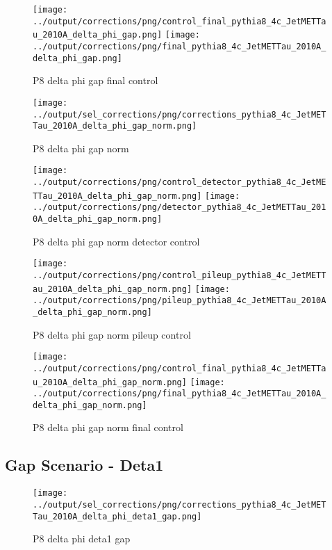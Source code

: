 \documentclass[11pt]{book}
\begin{document}
\begin{figure}[ht]
\centering
\texttt{[image: ../output/corrections/png/control\_final\_pythia8\_4c\_JetMETTau\_2010A\_delta\_phi\_gap.png]}
\texttt{[image: ../output/corrections/png/final\_pythia8\_4c\_JetMETTau\_2010A\_delta\_phi\_gap.png]}
\caption{P8 delta phi gap final control}
\label{fig:p8_JetMETTau_2010A_delta_phi_gap_final_control}
\end{figure}


\begin{figure}[ht]
\centering
\texttt{[image: ../output/sel\_corrections/png/corrections\_pythia8\_4c\_JetMETTau\_2010A\_delta\_phi\_gap\_norm.png]}
\caption{P8 delta phi gap norm}
\label{fig:p8_JetMETTau_2010A_delta_phi_gap_norm}
\end{figure}

\begin{figure}[ht]
\centering
\texttt{[image: ../output/corrections/png/control\_detector\_pythia8\_4c\_JetMETTau\_2010A\_delta\_phi\_gap\_norm.png]}
\texttt{[image: ../output/corrections/png/detector\_pythia8\_4c\_JetMETTau\_2010A\_delta\_phi\_gap\_norm.png]}
\caption{P8 delta phi gap norm detector control}
\label{fig:p8_JetMETTau_2010A_delta_phi_gap_norm_detector_control}
\end{figure}

\begin{figure}[ht]
\centering
\texttt{[image: ../output/corrections/png/control\_pileup\_pythia8\_4c\_JetMETTau\_2010A\_delta\_phi\_gap\_norm.png]}
\texttt{[image: ../output/corrections/png/pileup\_pythia8\_4c\_JetMETTau\_2010A\_delta\_phi\_gap\_norm.png]}
\caption{P8 delta phi gap norm pileup control}
\label{fig:p8_JetMETTau_2010A_delta_phi_gap_norm_pileup_control}
\end{figure}


\begin{figure}[ht]
\centering
\texttt{[image: ../output/corrections/png/control\_final\_pythia8\_4c\_JetMETTau\_2010A\_delta\_phi\_gap\_norm.png]}
\texttt{[image: ../output/corrections/png/final\_pythia8\_4c\_JetMETTau\_2010A\_delta\_phi\_gap\_norm.png]}
\caption{P8 delta phi gap norm final control}
\label{fig:p8_JetMETTau_2010A_delta_phi_gap_norm_final_control}
\end{figure}



\clearpage
\subsection{Gap Scenario - Deta1}
\begin{figure}[ht]
\centering
\texttt{[image: ../output/sel\_corrections/png/corrections\_pythia8\_4c\_JetMETTau\_2010A\_delta\_phi\_deta1\_gap.png]}
\caption{P8 delta phi deta1 gap}
\label{fig:p8_JetMETTau_2010A_delta_phi_deta1_gap}
\end{figure}
\end{document}
